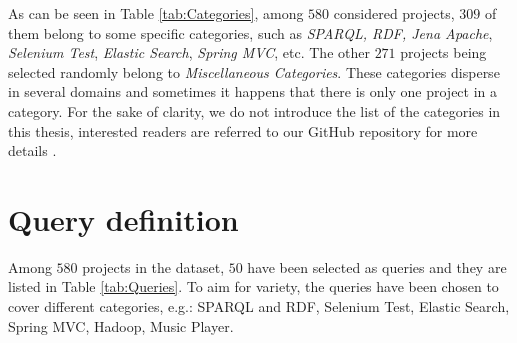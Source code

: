 As can be seen in Table \ref{tab:Categories}, among $580$ considered projects, $309$ of them belong to some specific categories, such as \emph{SPARQL, RDF, Jena Apache}, \emph{Selenium Test}, \emph{Elastic Search}, \emph{Spring MVC}, etc. The other $271$ projects being selected randomly belong to \emph{Miscellaneous Categories}. These categories disperse in several domains and sometimes it happens that there is only one project in a category. For the sake of clarity, we do not introduce the list of the categories in this thesis, interested readers are referred to our GitHub repository for more details \cite{CROSSSIM-DATA}.




\section{Query definition} \label{sec:Queries}

Among $580$ projects in the dataset, $50$ have been selected as queries and they are listed in Table \ref{tab:Queries}. To aim for variety, the queries have been chosen to cover different categories, e.g.: SPARQL and RDF, Selenium Test, Elastic Search, Spring MVC, Hadoop, Music Player.

